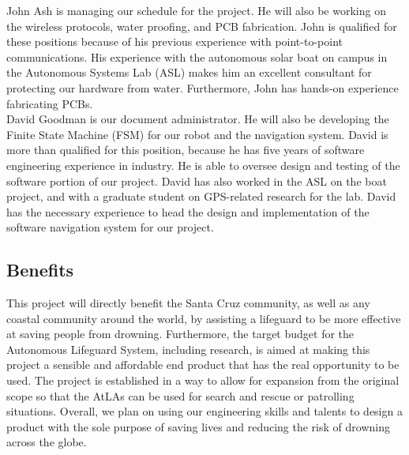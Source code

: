\documentclass[11pt]{article}
\begin{document}
John Ash is managing our schedule for the project. He will also be working on the wireless protocols, water proofing, and PCB fabrication. John is qualified for these positions because of his previous experience with point-to-point communications. His experience with the autonomous solar boat on campus in the Autonomous Systems Lab (ASL) makes him an excellent consultant for protecting our hardware from water. Furthermore, John has hands-on experience fabricating PCBs.\\

David Goodman is our document administrator. He will also be developing the Finite State Machine (FSM) for our robot and the navigation system. David is more than qualified for this position, because he has five years of software engineering experience in industry. He is able to oversee design and testing of the software portion of our project. David has also worked in the ASL on the boat project, and with a graduate student on GPS-related research for the lab. David has the necessary experience to head the design and implementation of the software navigation system for our project.

\subsection*{Benefits}

This project will directly benefit the Santa Cruz community, as well as any coastal community around the world, by assisting a lifeguard to be more effective at saving people from drowning. Furthermore, the target budget for the Autonomous Lifeguard System, including research, is aimed at making this project a sensible and affordable end product that has the real opportunity to be used. The project is established in a way to allow for expansion from the original scope so that the AtLAs can be used for search and rescue or patrolling situations. Overall, we plan on using our engineering skills and talents to design a product with the sole purpose of saving lives and reducing the risk of drowning across the globe.
\end{document}
